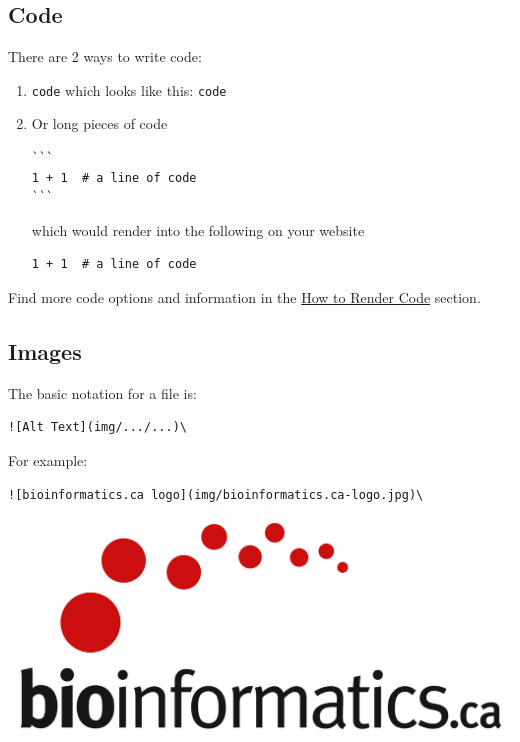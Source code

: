 \documentclass[
]{book}
\theoremstyle{definition}
\theoremstyle{definition}
\theoremstyle{definition}
\theoremstyle{definition}
\theoremstyle{remark}
\begin{document}
\subsection*{Code}\label{code}

There are 2 ways to write code:

\begin{enumerate}
\def\labelenumi{\arabic{enumi}.}
\item
  \texttt{\textasciigrave{}code\textasciigrave{}} which looks like this: \texttt{code}
\item
  Or long pieces of code

\begin{verbatim}
```
1 + 1  # a line of code
```
\end{verbatim}

  which would render into the following on your website

\begin{verbatim}
1 + 1  # a line of code
\end{verbatim}
\end{enumerate}

Find more code options and information in the \hyperref[render-code]{How to Render Code} section.

\subsection*{Images}\label{images}

The basic notation for a file is:

\begin{verbatim}
![Alt Text](img/.../...)\
\end{verbatim}

For example:

\begin{verbatim}
![bioinformatics.ca logo](img/bioinformatics.ca-logo.jpg)\
\end{verbatim}

\includegraphics{img/bioinformatics.ca-logo.jpg}\\
\end{document}
